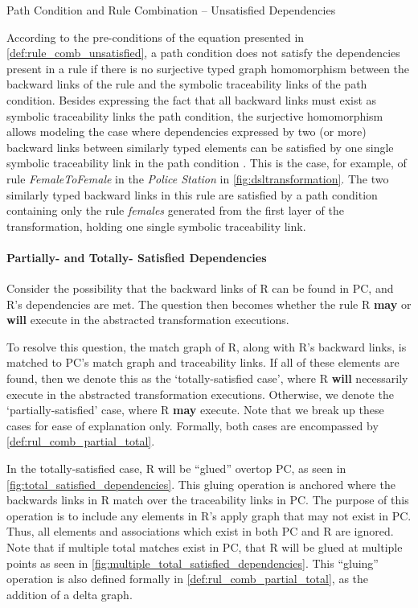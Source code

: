 \begin{definition}{Path Condition and Rule Combination -- Unsatisfied Dependencies\\} 
\label{def:rule_comb_unsatisfied}
\end{definition}

According to the pre-conditions of the equation presented in \cref{def:rule_comb_unsatisfied}, a path condition does not satisfy the dependencies present in a rule if there is no surjective typed graph homomorphism between the backward links of the rule and the symbolic traceability links of the path condition. Besides expressing the fact that all backward links must exist as symbolic traceability links the path condition, the surjective homomorphism allows modeling the case where dependencies expressed by two (or more) backward links between similarly typed elements can be satisfied by one single symbolic traceability link in the path condition . This is the case, for example, of rule \emph{FemaleToFemale} in the \emph{Police Station} in \cref{fig:dsltransformation}. The two similarly typed backward links in this rule are satisfied by a path condition containing only the rule \emph{females} generated from the first layer of the transformation, holding one single symbolic traceability link.


\paragraph{Partially- and Totally- Satisfied Dependencies}

Consider the possibility that the backward links of R can be found in PC, and R's dependencies are met. The question then becomes whether the rule R \textbf{may} or \textbf{will} execute in the abstracted transformation executions.

To resolve this question, the match graph of R, along with R's backward links, is matched to PC's match graph and traceability links. If all of these elements are found, then we denote this as the `totally-satisfied case', where R \textbf{will} necessarily execute in the abstracted transformation executions. Otherwise, we denote the `partially-satisfied' case, where R \textbf{may} execute. Note that we break up these cases for ease of explanation only. Formally, both cases are encompassed by \cref{def:rul_comb_partial_total}.

In the totally-satisfied case, R will be ``glued'' overtop PC, as seen in \cref{fig:total_satisfied_dependencies}. This gluing operation is anchored where the backwards links in R match over the traceability links in PC. The purpose of this operation is to include any elements in R's apply graph that may not exist in PC. Thus, all elements and associations which exist in both PC and R are ignored. Note that if multiple total matches exist in PC, that R will be glued at multiple points as seen in \cref{fig:multiple_total_satisfied_dependencies}. This ``gluing'' operation is also defined formally in \cref{def:rul_comb_partial_total}, as the addition of a delta graph.

